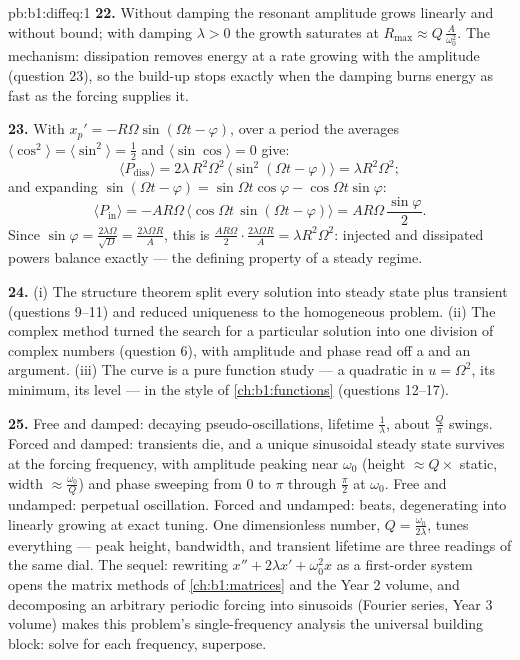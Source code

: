 \begin{solution}{pb:b1:diffeq:1}
\textbf{22.} Without damping the resonant amplitude grows linearly
and without bound; with damping $\lambda > 0$ the growth saturates
at $R_{\max} \approx Q\,\frac A{\omega_0^2}$. The mechanism:
dissipation removes energy at a rate growing with the amplitude
(question 23), so the build-up stops exactly when the damping
burns energy as fast as the forcing supplies it.

\textbf{23.} With $x_p' = -R\Omega\sin(\Omega t - \varphi)$, over
a period the averages $\langle\cos^2\rangle =
\langle\sin^2\rangle = \frac12$ and $\langle\sin\cos\rangle = 0$
give:
\[
\langle P_{\mathrm{diss}}\rangle
= 2\lambda\,R^2\Omega^2\,\langle\sin^2(\Omega t -
\varphi)\rangle = \lambda R^2\Omega^2 ;
\]
and expanding $\sin(\Omega t - \varphi) = \sin\Omega t\cos\varphi
- \cos\Omega t\sin\varphi$:
\[
\langle P_{\mathrm{in}}\rangle
= -AR\Omega\,\bigl\langle\cos\Omega t\,\sin(\Omega t -
\varphi)\bigr\rangle
= AR\Omega\,\frac{\sin\varphi}2 .
\]
Since $\sin\varphi = \frac{2\lambda\Omega}{\sqrt D} =
\frac{2\lambda\Omega R}A$, this is $\frac{AR\Omega}2 \cdot
\frac{2\lambda\Omega R}A = \lambda R^2\Omega^2$: injected and
dissipated powers balance exactly --- the defining property of a
steady regime.

\textbf{24.} (i) The structure theorem split every solution into
steady state plus transient (questions 9--11) and reduced
uniqueness to the homogeneous problem. (ii) The complex method
turned the search for a particular solution into one division of
complex numbers (question 6), with amplitude and phase read off a
 and an argument. (iii) The  curve is a pure
function study --- a quadratic in $u = \Omega^2$, its minimum,
its level  --- in the style of \cref{ch:b1:functions}
(questions 12--17).

\textbf{25.} Free and damped: decaying pseudo-oscillations,
lifetime $\frac1\lambda$, about $\frac Q\pi$ swings. Forced and
damped: transients die, and a unique sinusoidal steady state
survives at the forcing frequency, with amplitude peaking near
$\omega_0$ (height $\approx Q \times$ static, width $\approx
\frac{\omega_0}Q$) and phase sweeping from $0$ to $\pi$ through
$\frac\pi2$ at $\omega_0$. Free and undamped: perpetual
oscillation. Forced and undamped: beats, degenerating into
linearly growing  at exact tuning. One dimensionless
number, $Q = \frac{\omega_0}{2\lambda}$, tunes everything ---
peak height, bandwidth, and transient lifetime are three readings
of the same dial. The sequel: rewriting $x'' + 2\lambda x' +
\omega_0^2x$ as a first-order system opens the matrix methods of
\cref{ch:b1:matrices} and the Year 2 volume, and decomposing an
arbitrary periodic forcing into sinusoids (Fourier series, Year 3
volume) makes this problem's single-frequency analysis the
universal building block: solve for each frequency, superpose.
\end{solution}
